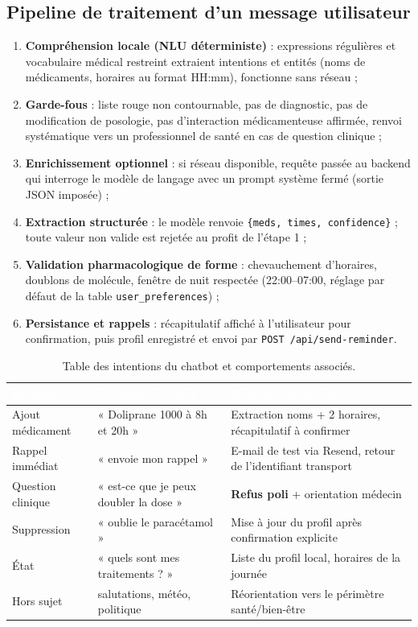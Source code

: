 \documentclass[11pt,a4paper]{article}
\begin{document}
\subsection{Pipeline de traitement d'un message utilisateur}
\begin{enumerate}[leftmargin=1.9em,itemsep=2pt]
 \item \textbf{Compréhension locale (NLU déterministe)} : expressions régulières et vocabulaire
 médical restreint extraient intentions et entités (noms de médicaments, horaires au format
 HH:mm), fonctionne sans réseau ;
 \item \textbf{Garde-fous} : liste rouge non contournable, pas de diagnostic, pas de modification
 de posologie, pas d'interaction médicamenteuse affirmée, renvoi systématique vers un
 professionnel de santé en cas de question clinique ;
 \item \textbf{Enrichissement optionnel} : si réseau disponible, requête passée au backend qui
 interroge le modèle de langage avec un prompt système fermé (sortie JSON imposée) ;
 \item \textbf{Extraction structurée} : le modèle renvoie
 \texttt{\{meds, times, confidence\}} ; toute valeur non valide est
 rejetée au profit de l'étape 1 ;
 \item \textbf{Validation pharmacologique de forme} : chevauchement d'horaires, doublons de molécule,
 fenêtre de nuit respectée (22:00--07:00, réglage par défaut de la table
 \texttt{user\_preferences}) ;
 \item \textbf{Persistance et rappels} : récapitulatif affiché à l'utilisateur pour confirmation,
 puis profil enregistré et envoi par \texttt{POST /api/send-reminder}.
\end{enumerate}

\begin{table}[H]
\centering\small
\begin{tabularx}{\linewidth}{p{3.4cm} p{3.6cm} X}
\toprule
\rowcolor{cwblue} \textcolor{white}{\bf Intention} & \textcolor{white}{\bf Exemple d'entrée} &
\textcolor{white}{\bf Réponse du système} \\
\midrule
Ajout médicament & « Doliprane 1000 à 8h et 20h » & Extraction noms + 2 horaires, récapitulatif à confirmer \\
Rappel immédiat & « envoie mon rappel » & E-mail de test via Resend, retour de l'identifiant transport \\
Question clinique & « est-ce que je peux doubler la dose » & \textbf{Refus poli} + orientation médecin \\
Suppression & « oublie le paracétamol » & Mise à jour du profil après confirmation explicite \\
État & « quels sont mes traitements ? » & Liste du profil local, horaires de la journée \\
Hors sujet & salutations, météo, politique & Réorientation vers le périmètre santé/bien-être \\
\bottomrule
\end{tabularx}
\caption{Table des intentions du chatbot et comportements associés.}
\label{tab:intents}
\end{table}
\end{document}
